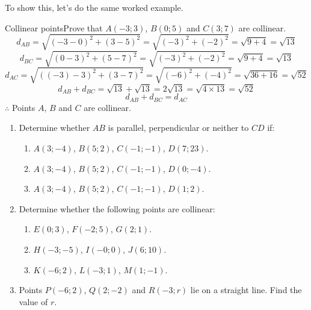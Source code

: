 To show this, let's do the same worked example.

\begin{wex}{Collinear points}{Prove that $A(-3;3)$, $B(0;5)$ and $C(3;7)$ are collinear.}{
\begin{equation*}
d_{AB} = \sqrt{(-3 - 0)^2 + (3 - 5)^2} = \sqrt{(-3)^2 + (-2)^2} = \sqrt{9 + 4} = \sqrt{13}
\end{equation*}
\begin{equation*}
d_{BC} = \sqrt{(0 - 3)^2 + (5 - 7)^2} = \sqrt{(-3)^2 + (-2)^2} = \sqrt{9 + 4} = \sqrt{13}
\end{equation*}
\begin{equation*}
d_{AC} = \sqrt{((-3) - 3)^2 + (3 - 7)^2} = \sqrt{(-6)^2 + (-4)^2} = \sqrt{36 + 16} = \sqrt{52}
\end{equation*}
\begin{equation*}
d_{AB} + d_{BC} = \sqrt{13} + \sqrt{13} = 2\sqrt{13} = \sqrt{4 \times 13} = \sqrt{52}
\end{equation*}
\begin{equation*}
d_{AB} + d_{BC} = d_{AC}
\end{equation*}
$\therefore$ Points $A$, $B$ and $C$ are collinear.
}
\end{wex}

\begin{exercises}{}
\begin{enumerate}
\item Determine whether $AB$ is parallel, perpendicular or neither to $CD$ if:
\begin{enumerate}
\item $A(3;-4)$, $B(5;2)$, $C(-1;-1)$, $D(7;23)$.
\item $A(3;-4)$, $B(5;2)$, $C(-1;-1)$, $D(0;-4)$.
\item $A(3;-4)$, $B(5;2)$, $C(-1;-1)$, $D(1;2)$.
\end{enumerate}

\item Determine whether the following points are collinear:
\begin{enumerate}
\item $E(0;3)$, $F(-2;5)$, $G(2;1)$.
\item $H(-3;-5)$, $I(-0;0)$, $J(6;10)$.
\item $K(-6;2)$, $L(-3;1)$, $M(1;-1)$.
\end{enumerate}
\item Points $P(-6;2)$, $Q(2;-2)$ and $R(-3;r)$ lie on a straight line. Find the value of $r$.
\end{enumerate}
\end{exercises}

